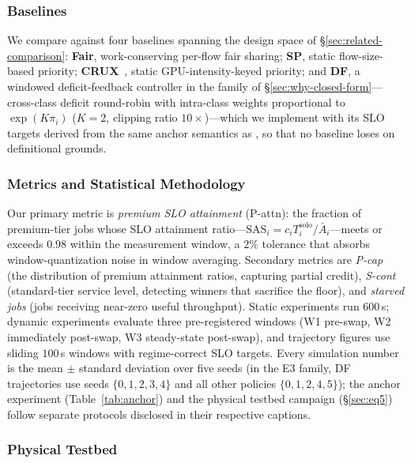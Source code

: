 \subsubsection{Baselines}
\label{sec:baselines}

We compare against four baselines spanning the design space of \S\ref{sec:related-comparison}: \textbf{Fair}, work-conserving per-flow fair sharing; \textbf{SP}, static flow-size-based priority; \textbf{CRUX}~\cite{Crux}, static GPU-intensity-keyed priority; and \textbf{DF}, a windowed deficit-feedback controller in the family of \S\ref{sec:why-closed-form}---cross-class deficit round-robin with intra-class weights proportional to $\exp(K\pi_i)$ ($K{=}2$, clipping ratio $10{\times}$)---which we implement with its SLO targets derived from the same anchor semantics as \Name, so that no baseline loses on definitional grounds.

\subsubsection{Metrics and Statistical Methodology}
\label{sec:metrics}

Our primary metric is \emph{premium SLO attainment} (P-attn): the fraction of premium-tier jobs whose SLO attainment ratio---$\mathrm{SAS}_i = c_i T_i^{\mathrm{solo}}/\bar{A}_i$---meets or exceeds $0.98$ within the measurement window, a $2\%$ tolerance that absorbs window-quantization noise in window averaging.
Secondary metrics are \emph{P-cap} (the distribution of premium attainment ratios, capturing partial credit), \emph{S-cont} (standard-tier service level, detecting winners that sacrifice the floor), and \emph{starved jobs} (jobs receiving near-zero useful throughput). Static experiments run $600$\,s; dynamic experiments evaluate three pre-registered windows (W1 pre-swap, W2 immediately post-swap, W3 steady-state post-swap), and trajectory figures use sliding $100$\,s windows with regime-correct SLO targets. Every simulation number is the mean $\pm$ standard deviation over five seeds (in the E3 family, DF trajectories use seeds $\{0,1,2,3,4\}$ and all other policies $\{0,1,2,4,5\}$); the anchor experiment (Table~\ref{tab:anchor}) and the physical testbed campaign (\S\ref{sec:eq5}) follow separate protocols disclosed in their respective captions.

\subsubsection{Physical Testbed}
\label{sec:testbed-setup}

